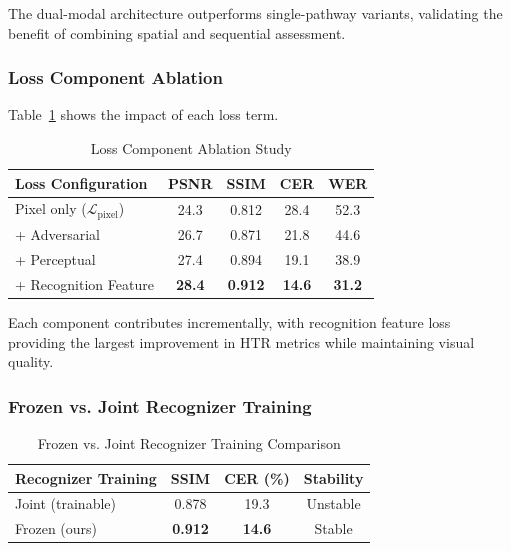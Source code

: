 \documentclass[journal]{IEEEtran}
\begin{document}
The dual-modal architecture outperforms single-pathway variants, validating the benefit of combining spatial and sequential assessment.

\subsubsection{Loss Component Ablation}

Table~\ref{table_ablation_loss} shows the impact of each loss term.

\begin{table}[!t]
\renewcommand{\arraystretch}{1.3}
\caption{Loss Component Ablation Study}
\label{table_ablation_loss}
\centering
\begin{tabular}{|l|c|c|c|c|}
\hline
\textbf{Loss Configuration} & \textbf{PSNR} & \textbf{SSIM} & \textbf{CER} & \textbf{WER} \\
\hline
Pixel only ($\mathcal{L}_{\text{pixel}}$) & 24.3 & 0.812 & 28.4 & 52.3 \\
+ Adversarial & 26.7 & 0.871 & 21.8 & 44.6 \\
+ Perceptual & 27.4 & 0.894 & 19.1 & 38.9 \\
+ Recognition Feature & \textbf{28.4} & \textbf{0.912} & \textbf{14.6} & \textbf{31.2} \\
\hline
\end{tabular}
\end{table}

Each component contributes incrementally, with recognition feature loss providing the largest improvement in HTR metrics while maintaining visual quality.

\subsubsection{Frozen vs. Joint Recognizer Training}

\begin{table}[!t]
\renewcommand{\arraystretch}{1.3}
\caption{Frozen vs. Joint Recognizer Training Comparison}
\label{table_ablation_recognizer}
\centering
\begin{tabular}{|l|c|c|c|}
\hline
\textbf{Recognizer Training} & \textbf{SSIM} & \textbf{CER (\%)} & \textbf{Stability} \\
\hline
Joint (trainable) & 0.878 & 19.3 & Unstable \\
Frozen (ours) & \textbf{0.912} & \textbf{14.6} & Stable \\
\hline
\end{tabular}
\end{table}
\end{document}
